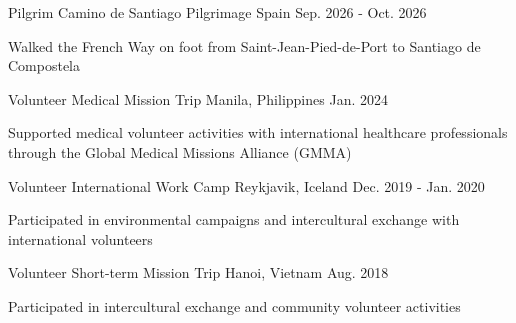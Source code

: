 \documentclass[11pt, a4paper]{awesome-cv}
\let\origcvsubsection\cvsubsection
\renewcommand{\cvsubsection}[1]{\needspace{5\baselineskip}\origcvsubsection{#1}}
\begin{document}

\begin{cventries}
\cventry
    {Pilgrim}
    {Camino de Santiago Pilgrimage}
    {Spain}
    {Sep. 2026 - Oct. 2026}
    {
      \begin{cvitems}
        \item {Walked the French Way on foot from Saint-Jean-Pied-de-Port to Santiago de Compostela}
      \end{cvitems}
    }
\vspace{-1mm}
\cventry
    {Volunteer}
    {Medical Mission Trip}
    {Manila, Philippines}
    {Jan. 2024}
    {
      \begin{cvitems}
        \item {Supported medical volunteer activities with international healthcare professionals through the Global Medical Missions Alliance (GMMA)}
      \end{cvitems}
    }
\vspace{-1mm}
\cventry
    {Volunteer}
    {International Work Camp}
    {Reykjavik, Iceland}
    {Dec. 2019 - Jan. 2020}
    {
      \begin{cvitems}
        \item {Participated in environmental campaigns and intercultural exchange with international volunteers}
      \end{cvitems}
    }
\vspace{-1mm}
\cventry
    {Volunteer}
    {Short-term Mission Trip}
    {Hanoi, Vietnam}
    {Aug. 2018}
    {
      \begin{cvitems}
        \item {Participated in intercultural exchange and community volunteer activities}
      \end{cvitems}
    }
\end{cventries}
\end{document}
